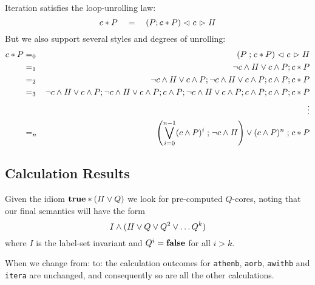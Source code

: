 Iteration  satisfies the loop-unrolling law:
\[
  c * P  \quad=\quad (P ; c * P ) \mathrel{\lhd ~ {c} ~ \rhd} \mathit{II}
\]
But we also support several styles and degrees of unrolling:
\begin{eqnarray*}
   c*P
   &=_0& (P\mathrel{;} c*P) \mathrel{\lhd ~ {c} ~ \rhd} \mathit{II}
\\ &=_1& \lnot c \land \mathit{II}
         \lor
         c \land P ; c * P
\\ &=_2& \lnot c \land \mathit{II}
         \lor
         c \land P ; \lnot c \land \mathit{II}
         \lor
         c \land P ; c \land P ; c * P
\\ &=_3& \lnot c \land \mathit{II}
         \lor
         c \land P ; \lnot c \land \mathit{II}
         \lor
         c \land P ; c \land P ; \lnot c \land \mathit{II}
         \lor
         c \land P ; c \land P ; c \land P ; c *P
\\ && \vdots
\\ &=_n& \left(
           \bigvee_{i=0}^{n-1}  (c \land P)^i \mathrel{;} \lnot c \land \mathit{II}
         \right)
         \lor
         (c \land P)^n \mathrel{;} c *P
\end{eqnarray*}


\subsection{Calculation Results}

Given the idiom $\mathbf{true} * (\mathit{II} \lor Q)$
we look for pre-computed $Q$-cores,
noting that our final semantics will have the form
\[
  I \land ( \mathit{II} \lor Q \lor Q^2 \lor \dots Q^k)
\]
where $I$ is the label-set invariant
and $Q^i = \mathbf{false}$ for all $i > k$.

When we change from:
\noindent
to:
\noindent
the calculation outcomes
for \texttt{athenb}, \texttt{aorb}, \texttt{awithb} and \texttt{itera} are unchanged,
and consequently so are all the other calculations.
